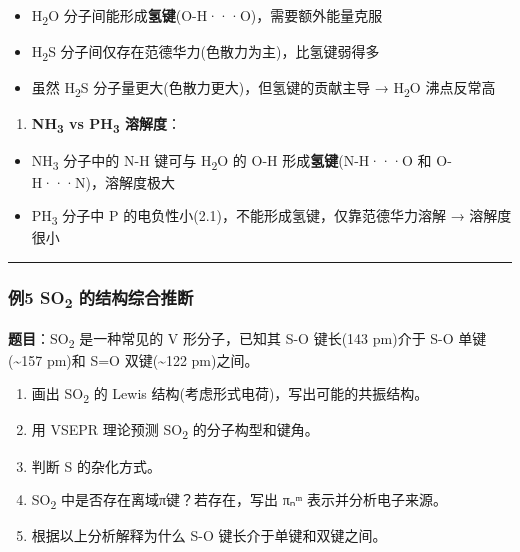\begin{itemize}
\tightlist
\item
  H\textsubscript{2}O 分子间能形成\textbf{氢键}(O-H···O)，需要额外能量克服
\item
  H\textsubscript{2}S 分子间仅存在范德华力(色散力为主)，比氢键弱得多
\item
  虽然 H\textsubscript{2}S 分子量更大(色散力更大)，但氢键的贡献主导 → H\textsubscript{2}O 沸点反常高
\end{itemize}

\begin{enumerate}
\def\labelenumi{(\arabic{enumi})}
\setcounter{enumi}{1}
\tightlist
\item
  \textbf{NH\textsubscript{3} vs PH\textsubscript{3} 溶解度}：
\end{enumerate}

\begin{itemize}
\tightlist
\item
  NH\textsubscript{3} 分子中的 N-H 键可与 H\textsubscript{2}O 的 O-H 形成\textbf{氢键}(N-H···O 和 O-H···N)，溶解度极大
\item
  PH\textsubscript{3} 分子中 P 的电负性小(2.1)，不能形成氢键，仅靠范德华力溶解 → 溶解度很小
\end{itemize}

\begin{center}\rule{0.5\linewidth}{0.5pt}\end{center}

\subsubsection{\texorpdfstring{例5 SO\textsubscript{2} 的结构综合推断}{例5 SO2 的结构综合推断}}\label{ux4f8b5-so2-ux7684ux7ed3ux6784ux7efcux5408ux63a8ux65ad}

\textbf{题目}：SO\textsubscript{2} 是一种常见的 V 形分子，已知其 S-O 键长(143 pm)介于 S-O 单键(\textasciitilde157 pm)和 S=O 双键(\textasciitilde122 pm)之间。

\begin{enumerate}
\def\labelenumi{(\arabic{enumi})}
\tightlist
\item
  画出 SO\textsubscript{2} 的 Lewis 结构(考虑形式电荷)，写出可能的共振结构。
\item
  用 VSEPR 理论预测 SO\textsubscript{2} 的分子构型和键角。
\item
  判断 S 的杂化方式。
\item
  SO\textsubscript{2} 中是否存在离域π键？若存在，写出 πₙᵐ 表示并分析电子来源。
\item
  根据以上分析解释为什么 S-O 键长介于单键和双键之间。
\end{enumerate}

